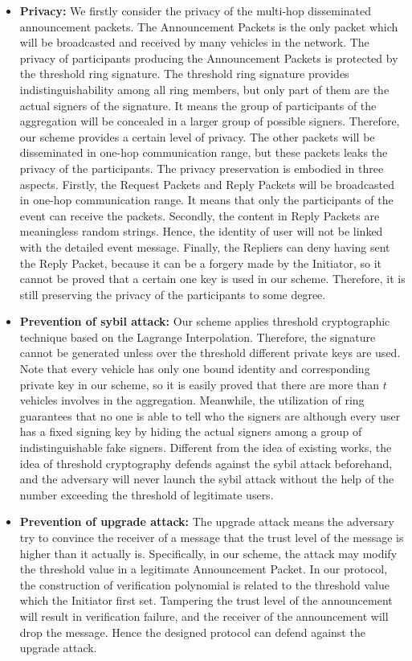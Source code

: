 \documentclass[a4paper]{article}
\begin{document}
\begin{itemize}
  \item \textbf{Privacy:} We firstly consider the privacy of the multi-hop disseminated announcement packets. The Announcement Packets is the only packet which will be broadcasted and received by many vehicles in the network. The privacy of participants producing the Announcement Packets is protected by the threshold ring signature. The threshold ring signature provides indistinguishability among all ring members, but only part of them are the actual signers of the signature. It means the group of participants of the aggregation will be concealed in a larger group of possible signers. Therefore, our scheme provides a certain level of privacy. The other packets will be disseminated in one-hop communication range, but these packets leaks the privacy of the participants. The privacy preservation is embodied in three aspects. Firstly, the Request Packets and Reply Packets will be broadcasted in one-hop communication range. It means that only the participants of the event can receive the packets. Secondly, the content in Reply Packets are meaningless random strings. Hence, the identity of user will not be linked with the detailed event message. Finally, the Repliers can deny having sent the Reply Packet, because it can be a forgery made by the Initiator, so it cannot be proved that a certain one key is used in our scheme. Therefore, it is still preserving the privacy of the participants to some degree.
  \item \textbf{Prevention of sybil attack:} Our scheme applies threshold cryptographic technique based on the Lagrange Interpolation. Therefore, the signature cannot be generated unless over the threshold different private keys are used. Note that every vehicle has only one bound identity and corresponding private key in our scheme, so it is easily proved that there are more than $t$ vehicles involves in the aggregation. Meanwhile, the utilization of ring guarantees that no one is able to tell who the signers are although every user has a fixed signing key by hiding the actual signers among a group of indistinguishable fake signers. Different from the idea of existing works, the idea of threshold cryptography defends against the sybil attack beforehand, and the adversary will never launch the sybil attack without the help of the number exceeding the threshold of legitimate users.
  \item \textbf{Prevention of upgrade attack:} The upgrade attack means the adversary try to convince the receiver of a message that the trust level of the message is higher than it actually is. Specifically, in our scheme, the attack may modify the threshold value in a legitimate Announcement Packet. In our protocol, the construction of verification polynomial is related to the threshold value which the Initiator first set. Tampering the trust level of the announcement will result in verification failure, and the receiver of the announcement will drop the message. Hence the designed protocol can defend against the upgrade attack.

\end{itemize}
\end{document}
